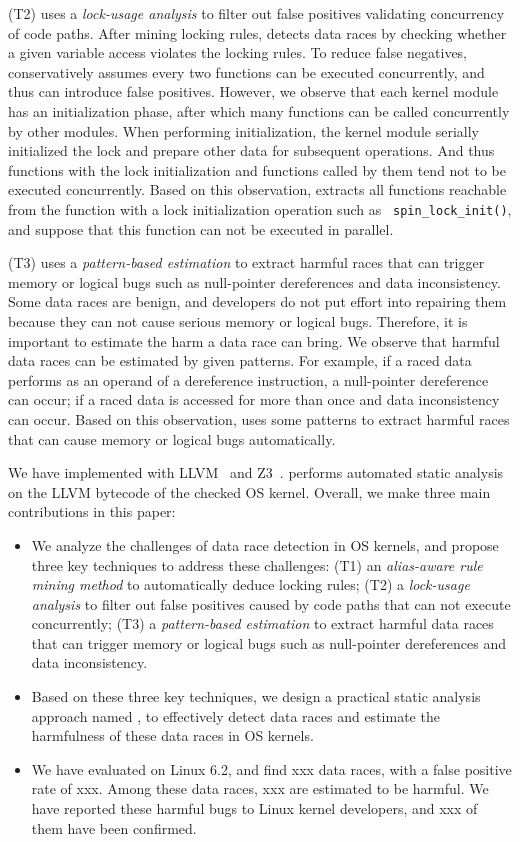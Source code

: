(T2) \sys uses a {\em lock-usage analysis} to filter out false positives 
validating concurrency of code paths. After mining locking rules, \sys detects 
data races by checking whether a given variable access violates the 
locking rules. To reduce false negatives, \sys conservatively assumes 
every two functions can be executed concurrently, and thus can introduce false 
positives. However, we observe that each kernel module has an initialization 
phase, after which many functions can be called concurrently by other modules. 
When performing initialization, the kernel module serially initialized the lock 
and prepare other data for subsequent operations. And thus functions with the 
lock initialization and functions called by them tend not to be executed 
concurrently. Based on this observation, \sys extracts all functions 
reachable from the function with a lock initialization operation such as {\tt 
spin\_lock\_init()}, and suppose that this function can not be executed in 
parallel.

(T3) \sys uses a {\em pattern-based estimation} to extract harmful races 
that can trigger memory or logical bugs such as null-pointer dereferences and 
data inconsistency. Some data races are benign, and developers do not put 
effort into repairing them because they can not cause serious memory or logical 
bugs. Therefore, it is important to estimate the harm a data race can bring. We 
observe that harmful data races can be estimated by given patterns. For 
example, if a raced data performs as an operand of a dereference instruction, a 
null-pointer dereference can occur; if a raced data is accessed for more than 
once and data inconsistency can occur. Based on this observation, \sys 
uses some patterns to extract harmful races that can cause memory or logical 
bugs automatically.

We have implemented \sys with LLVM~\cite{clang} and Z3~\cite{z3}. 
\sys performs automated static analysis on the LLVM bytecode of the 
checked OS kernel. Overall, we make three main contributions in this paper:

\begin{itemize}
	\item We analyze the challenges of data race detection in OS kernels, and 
	propose three key techniques to address	these challenges: (T1) an {\em 
	alias-aware rule mining method} to automatically deduce locking rules; (T2) 
	a {\em lock-usage analysis} to filter out false positives caused by 
	code paths that can not execute concurrently; (T3) a {\em pattern-based 
	estimation} to extract harmful data races that can trigger memory or 
	logical bugs such as null-pointer dereferences and data inconsistency.	
	\item Based on these three key techniques, we design a practical static 
	analysis approach named \sys, to effectively detect data races and 
	estimate the harmfulness of these data races in OS kernels.
	\item We have evaluated \sys on Linux 6.2, and find xxx data races, 	
	with a false positive rate of xxx. Among these data races, xxx are 
	estimated to be harmful. We have reported these harmful bugs to Linux 
	kernel developers, and xxx of them have been confirmed.
\end{itemize}

